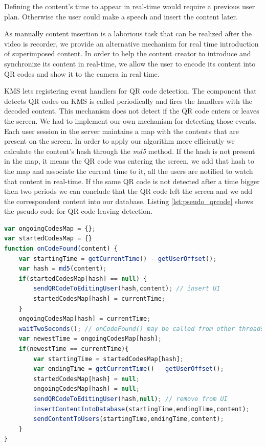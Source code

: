	Defining the content's time to appear in real-time would require a previous user plan. Otherwise the user could make a speech and insert the content later.


	As manually content insertion is a laborious task that can be realized after the video is recorder, we provide an alternative mechanism for real time introduction of superimposed content.	In order to help the content creator to introduce and synchronize its content in real-time, we allow the user to encode its content into \ac{QR} codes and show it to the camera in real time.

	\ac{KMS} lets registering event handlers for \ac{QR} code detection. The component that detects \ac{QR} codes on \ac{KMS} is called periodically and fires the handlers with the decoded content. This mechanism does not detect if the \ac{QR} code enters or leaves the screen. We had to implement our own mechanism for detecting those events. Each user session in the server maintains a map with the contents that are present on the screen. In order to apply our algorithm more efficiently we calculate the content's hash through the \emph{md5} method. If the hash is not present in the map, it means the \ac{QR} code was entering the screen, we add that hash to the map and associate the current time to it, all the users are notified to watch that content in real-time. If the same \ac{QR} code is not detected after a time bigger then two periods we can conclude that the \ac{QR} code left the screen and we add the correspondent content into our database. Listing \ref{lst:pseudo_qrcode} shows the pseudo code for \ac{QR} code leaving detection.

\begin{minipage}{\linewidth}
\begin{lstlisting}[caption={Pseudo code for QR code leaving detection},label={lst:pseudo_qrcode},language=JavaScript]
var ongoingCodesMap = {};
var startedCodesMap = {}
function onCodeFound(content) {
	var startingTime = getCurrentTime() - getUserOffset();
	var hash = md5(content);
	if(startedCodesMap[hash] == null) {
		sendQRCodeToEditingUser(hash,content); // insert UI
		startedCodesMap[hash] = currentTime;
	}
	ongoingCodesMap[hash] = currentTime;
	waitTwoSeconds(); // onCodeFound() may be called from other threads
	var newestTime = ongoingCodesMap[hash]; 
	if(newestTime == currentTime){
		var startingTime = startedCodesMap[hash];
		var endingTime = getCurrentTime() - getUserOffset();
		startedCodesMap[hash] = null; 
		ongoingCodesMap[hash] = null; 
		sendQRCodeToEditingUser(hash,null); // remove from UI
		insertContentIntoDatabase(startingTime,endingTime,content);
		sendContentToUsers(startingTime,endingTime,content);
	}
}
\end{lstlisting}
\end{minipage}


